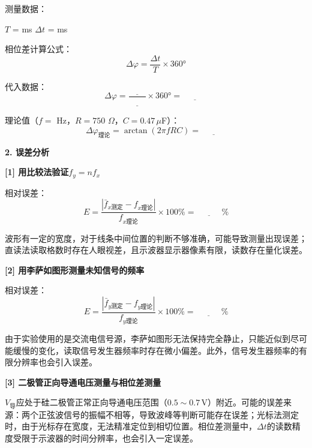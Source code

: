 \documentclass[a4paper,12pt]{article}
\begin{document}
{测量数据：

$T$ = \underline{\quad\quad} ms \qquad $\Delta t$ = \underline{\quad\quad} ms

\vspace{0.2cm}

相位差计算公式：
\begin{equation}
    \Delta\varphi = \frac{\Delta t}{T} \times 360°
\end{equation}

代入数据：
\[
\Delta\varphi = \frac{\underline{\quad\quad}}{\underline{\quad\quad}} \times 360° = \underline{\quad\quad\quad}
\]

理论值（$f = $ \underline{\quad\quad} Hz，$R = 750$ $\Omega$，$C = 0.47\,\mu$F）：
\begin{equation}
    \Delta\varphi_{\text{理论}} = \arctan(2\pi f R C) = \underline{\quad\quad\quad}
\end{equation}

}

\vspace{0.5cm}

{\fontsize{14pt}{20pt}\selectfont \textbf{2. 误差分析}}

\vspace{0.3cm}

{\fontsize{12pt}{18pt}\selectfont

\textbf{[1] 用比较法验证$f_y = nf_x$}

相对误差：
\[
E = \frac{|\bar{f}_{x\text{测定}} - f_{x\text{理论}}|}{f_{x\text{理论}}} \times 100\% = \underline{\quad\quad\quad}\%
\]

波形有一定的宽度，对于线条中间位置的判断不够准确，可能导致测量出现误差；直读法读取格数时存在人眼视差，且示波器显示器像素有限，读数存在量化误差。

\vspace{0.3cm}

\textbf{[2] 用李萨如图形测量未知信号的频率}

相对误差：
\[
E = \frac{|\bar{f}_{y\text{测定}} - f_{y\text{理论}}|}{f_{y\text{理论}}} \times 100\% = \underline{\quad\quad\quad}\%
\]

由于实验使用的是交流电信号源，李萨如图形无法保持完全静止，只能近似到尽可能缓慢的变化，读取信号发生器频率时存在微小偏差。此外，信号发生器频率的有限分辨率也会引入误差。

\vspace{0.3cm}

\textbf{[3] 二极管正向导通电压测量与相位差测量}

$V_{\text{导}}$应处于硅二极管正常正向导通电压范围（$0.5\sim0.7$\,V）附近。可能的误差来源：两个正弦波信号的振幅不相等，导致波峰等判断可能存在误差；光标法测定时，由于光标存在宽度，无法精准定位到相切位置。相位差测量中，$\Delta t$的读数精度受限于示波器的时间分辨率，也会引入一定误差。

}
\end{document}

